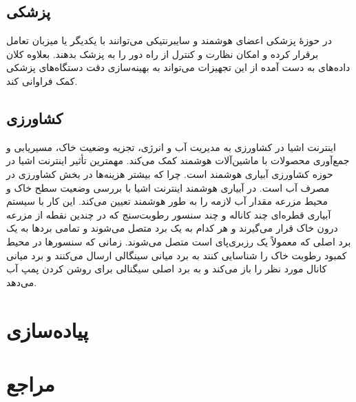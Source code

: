 \documentclass[a4paper, margin=1in]{article}
\begin{document}
\subsection{پزشکی}
در حوزهٔ پزشکی اعضای هوشمند و سایبرنتیکی می‌توانند با یکدیگر یا میزبان تعامل برقرار کرده
و امکان نظارت و کنترل از راه دور را به پزشک بدهند.
بعلاوه کلان داده‌های به دست آمده از این تجهیزات می‌تواند به بهینه‌سازی دقت دستگاه‌های پزشکی کمک فراوانی کند.

\subsection{کشاورزی}
اینترنت اشیا در کشاورزی به مدیریت آب و انرژی، تجزیه وضعیت خاک، مسیریابی و جمع‌آوری محصولات با ماشین‌آلات هوشمند کمک می‌کند.
مهمترین تأثیر اینترنت اشیا در حوزه کشاورزی آبیاری هوشمند است. چرا که بیشتر هزینه‌ها در بخش کشاورزی در مصرف آب است.
در آبیاری هوشمند اینترنت اشیا با بررسی وضعیت سطح خاک و محیط مزرعه مقدار آب لازمه را به طور هوشمند تعیین می‌کند.
این کار با سیستم آبیاری قطره‌ای چند کاناله و چند سنسور رطوبت‌سنج که در چندین نقطه از مزرعه درون خاک قرار می‌گیرند و
هر کدام به یک برد متصل می‌شوند و تمامی بردها به یک برد اصلی که معمولاً یک رزبری‌پای است متصل می‌شوند.
زمانی که سنسورها در محیط کمبود رطوبت خاک را شناسایی کنند به برد میانی سینگالی ارسال می‌کنند و
برد میانی کانال مورد نظر را باز می‌کند و به برد اصلی سیگنالی برای روشن کردن پمپ آب می‌دهد.\cite{javat}

\section{پیاده‌سازی}

\newpage
\section*{مراجع}
\begin{latin}
    \printbibliography[heading=none] %
\end{latin}
\end{document}
